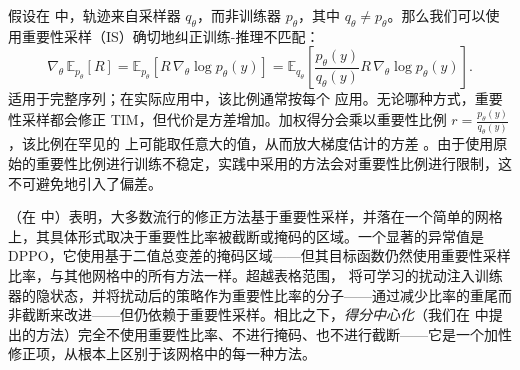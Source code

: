 假设在  中，轨迹来自采样器 $q_\theta$，而非训练器 $p_\theta$，其中 $q_\theta \ne p_\theta$。那么我们可以使用重要性采样（IS）确切地纠正训练-推理不匹配：
\begin{equation}
\nabla_\theta \, \mathbb{E}_{p_\theta}[R] = \mathbb{E}_{p_\theta} \left[ R \, \nabla_\theta \log p_\theta(y) \right] = \mathbb{E}_{q_\theta} \left[ \frac{p_\theta(y)}{q_\theta(y)} R \, \nabla_\theta \log p_\theta(y) \right].
\label{eq:policy_grad_is}
\end{equation}
 适用于完整序列；在实际应用中，该比例通常按每个 \citep{gspo} 应用。无论哪种方式，重要性采样都会修正 TIM，但代价是方差增加。加权得分会乘以重要性比例 $r = \frac{p_\theta(y)}{q_\theta(y)}$，该比例在罕见的 \citep{gspo} 上可能取任意大的值，从而放大梯度估计的方差 \citep{ionides, owen_mc}。由于使用原始的重要性比例进行训练不稳定，实践中采用的方法会对重要性比例进行限制，这不可避免地引入了偏差。

（在  中）表明，大多数流行的修正方法基于重要性采样，并落在一个简单的网格上，其具体形式取决于重要性比率被截断或掩码的区域。一个显著的异常值是 DPPO，它使用基于二值总变差的掩码区域——但其目标函数仍然使用重要性采样比率，与其他网格中的所有方法一样。超越表格范围，\citet{alp} 将可学习的扰动注入训练器的隐状态，并将扰动后的策略作为重要性比率的分子——通过减少比率的重尾而非截断来改进——但仍依赖于重要性采样。相比之下，\textit{得分中心化}（我们在  中提出的方法）完全不使用重要性比率、不进行掩码、也不进行截断——它是一个加性修正项，从根本上区别于该网格中的每一种方法。
